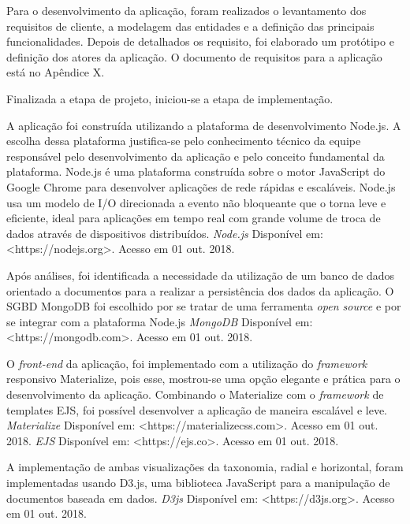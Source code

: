 \par
Para o desenvolvimento da aplicação, foram realizados o levantamento dos requisitos de cliente, a modelagem das entidades e a definição das principais funcionalidades. 
Depois de detalhados os requisito, foi elaborado um protótipo e definição dos atores da aplicação. O documento de requisitos para a aplicação está no Apêndice X. 

\par
Finalizada a etapa de projeto, iniciou-se a etapa de implementação. 

A aplicação foi construída utilizando a plataforma de desenvolvimento Node.js. A escolha dessa plataforma justifica-se pelo conhecimento técnico da equipe
responsável pelo desenvolvimento da aplicação e pelo conceito fundamental da plataforma. Node.js é uma plataforma construída sobre o motor JavaScript do 
Google Chrome para desenvolver aplicações de rede rápidas e escaláveis. Node.js usa um modelo de I/O direcionada a evento não bloqueante que o torna leve e eficiente,
ideal para aplicações em tempo real com grande volume de troca de dados através de dispositivos distribuídos. 
\textit{Node.js} Disponível em: <https://nodejs.org>. Acesso em 01 out. 2018.

\par
Após análises, foi identificada a necessidade da utilização de um banco de dados orientado a documentos para a realizar a persistência dos dados da aplicação. 
O SGBD MongoDB foi escolhido por se tratar de uma ferramenta \textit{open source} e por se integrar com a plataforma Node.js 
\textit{MongoDB} Disponível em: <https://mongodb.com>. Acesso em 01 out. 2018.

\par
O \textit{front-end} da aplicação, foi implementado com a utilização do \textit{framework} responsivo Materialize, pois esse, 
mostrou-se uma opção elegante e prática para o desenvolvimento da aplicação. Combinando o Materialize com o \textit{framework} de templates EJS, 
foi possível desenvolver a aplicação de maneira escalável e leve. \textit{Materialize} Disponível em: <https://materializecss.com>. Acesso em 01 out. 2018.
\textit{EJS} Disponível em: <https://ejs.co>. Acesso em 01 out. 2018.

\par
A implementação de ambas visualizações da taxonomia, radial e horizontal, foram implementadas usando D3.js, uma biblioteca JavaScript para a manipulação de documentos 
baseada em dados. \textit{D3js} Disponível em: <https://d3js.org>. Acesso em 01 out. 2018.

